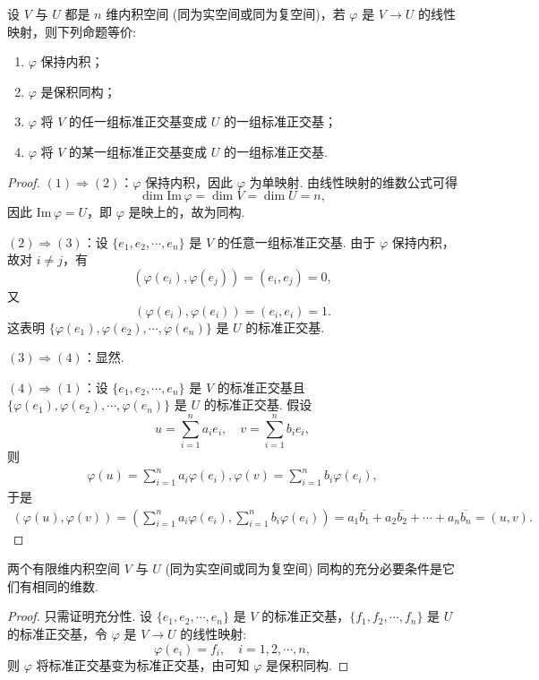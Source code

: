 \documentclass[../../main.tex]{subfiles}
\begin{document}
\begin{theorem}\label{theorem:保积同构的等价命题}
设 $V$ 与 $U$ 都是 $n$ 维内积空间 (同为实空间或同为复空间)，若 $\varphi$ 是 $V \to U$ 的线性映射，则下列命题等价:
\begin{enumerate}[(1)]
\item $\varphi$ 保持内积；

\item  $\varphi$ 是保积同构；

\item  $\varphi$ 将 $V$ 的任一组标准正交基变成 $U$ 的一组标准正交基；

\item $\varphi$ 将 $V$ 的某一组标准正交基变成 $U$ 的一组标准正交基.
\end{enumerate}
\end{theorem}
\begin{proof}
$(1) \Rightarrow (2)$：$\varphi$ 保持内积，因此 $\varphi$ 为单映射. 由线性映射的维数公式可得
\[
\dim \text{Im}\,\varphi = \dim V = \dim U = n,
\]
因此 $\text{Im}\,\varphi = U$，即 $\varphi$ 是映上的，故为同构.

$(2) \Rightarrow (3)$：设 $\{e_1,e_2,\cdots,e_n\}$ 是 $V$ 的任意一组标准正交基. 由于 $\varphi$ 保持内积，故对 $i \neq j$，有
\[
(\varphi(e_i),\varphi(e_j)) = (e_i,e_j) = 0,
\]
又
\[
(\varphi(e_i),\varphi(e_i)) = (e_i,e_i) = 1.
\]
这表明 $\{\varphi(e_1),\varphi(e_2),\cdots,\varphi(e_n)\}$ 是 $U$ 的标准正交基.

$(3) \Rightarrow (4)$：显然.

$(4) \Rightarrow (1)$：设 $\{e_1,e_2,\cdots,e_n\}$ 是 $V$ 的标准正交基且 $\{\varphi(e_1),\varphi(e_2),\cdots,\varphi(e_n)\}$ 是 $U$ 的标准正交基. 假设
\[
u = \sum_{i = 1}^{n}a_ie_i,\quad v = \sum_{i = 1}^{n}b_ie_i,
\]
则
\begin{align*}
\varphi (u)=\sum_{i=1}^n{a_i\varphi (e_i),\varphi (v)=\sum_{i=1}^n{b_i\varphi (e_i),}}
\end{align*}
于是
\begin{align*}
(\varphi (u),\varphi (v))=\left( \sum_{i=1}^n{a_i\varphi (e_i),\sum_{i=1}^n{b_i\varphi (e_i)}} \right) =a_1\overline{b_1}+a_2\overline{b_2}+\cdots +a_n\overline{b_n}=(u,v).
\end{align*}
\end{proof}

\begin{corollary}\label{corollary:有限维内积空间同构的充要条件}
两个有限维内积空间 $V$ 与 $U$ (同为实空间或同为复空间) 同构的充分必要条件是它们有相同的维数.
\end{corollary}
\begin{proof}
只需证明充分性. 设 $\{e_1,e_2,\cdots,e_n\}$ 是 $V$ 的标准正交基，$\{f_1,f_2,\cdots,f_n\}$ 是 $U$ 的标准正交基，令 $\varphi$ 是 $V \to U$ 的线性映射:
\[
\varphi(e_i) = f_i,\quad i = 1,2,\cdots,n,
\]
则 $\varphi$ 将标准正交基变为标准正交基，由可知 $\varphi$ 是保积同构.
\end{proof}
\end{document}
